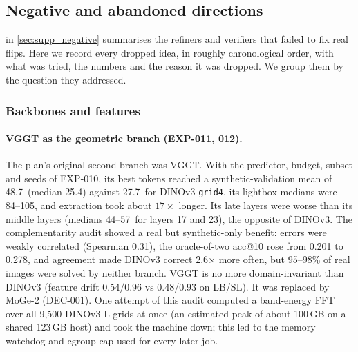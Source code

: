 \subsection{Negative and abandoned directions}\label{app:log_negative}

 in \cref{sec:supp_negative} summarises the refiners and verifiers that failed to fix real flips. Here we record every dropped idea, in roughly chronological order, with what was tried, the numbers and the reason it was dropped. We group them by the question they addressed.

\subsubsection{Backbones and features}\label{app:log_neg_feat}

\paragraph{VGGT as the geometric branch (EXP-011, 012).}
The plan's original second branch was VGGT. With the predictor, budget, subset and seeds of EXP-010, its best tokens reached a synthetic-validation mean of 48.7\appDdeg\ (median 25.4\appDdeg) against 27.7\appDdeg\ for DINOv3 \texttt{grid4}, its lightbox medians were 84--105\appDdeg, and extraction took about $17\times$ longer. Its late layers were worse than its middle layers (medians 44--57\appDdeg\ for layers 17 and 23), the opposite of DINOv3. The complementarity audit showed a real but synthetic-only benefit: errors were weakly correlated (Spearman 0.31), the oracle-of-two acc@10 rose from 0.201 to 0.278, and agreement made DINOv3 correct 2.6$\times$ more often, but 95--98\% of real images were solved by neither branch. VGGT is no more domain-invariant than DINOv3 (feature drift 0.54/0.96 vs 0.48/0.93 on LB/SL). It was replaced by MoGe-2 (DEC-001). One attempt of this audit computed a band-energy FFT over all 9,500 DINOv3-L grids at once (an estimated peak of about 100\,GB on a shared 123\,GB host) and took the machine down; this led to the memory watchdog and cgroup cap used for every later job.

